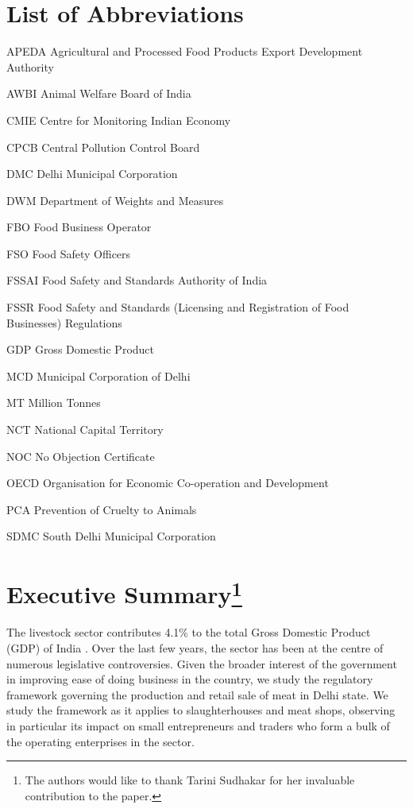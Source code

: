 \documentclass[a4paper, 12pt]{article}
\begin{document}
\section*{List of Abbreviations}
\begin{abbrv}
\item[APEDA] Agricultural and Processed Food Products Export Development Authority
\item[AWBI] Animal Welfare Board of India
\item[CMIE] Centre for Monitoring Indian Economy
\item[CPCB] Central Pollution Control Board
\item[DMC] Delhi Municipal Corporation
\item[DWM] Department of Weights and Measures
\item[FBO] Food Business Operator
\item[FSO] Food Safety Officers
\item[FSSAI] Food Safety and Standards Authority of India
\item[FSSR] Food Safety and Standards (Licensing and Registration of Food Businesses) Regulations
\item[GDP] Gross Domestic Product
\item[MCD] Municipal Corporation of Delhi
\item[MT] Million Tonnes
\item[NCT] National Capital Territory
\item[NOC] No Objection Certificate
\item[OECD] Organisation for Economic Co-operation and Development
\item[PCA] Prevention of Cruelty to Animals
\item[SDMC] South Delhi Municipal Corporation 
\end{abbrv}
\newpage
\section*{Executive Summary\footnote{The authors would like to thank Tarini Sudhakar for her invaluable contribution to the paper.}}

The livestock sector contributes 4.1\% to the total Gross Domestic Product (GDP) of India \parencite{economicreport}. Over the last few years, the sector has been at the centre of numerous legislative controversies. Given the broader interest of the government in improving ease of doing business in the country, we study the regulatory framework governing the production and retail sale of meat in Delhi state. We study the framework as it applies to slaughterhouses and meat shops, observing in particular its impact on small entrepreneurs and traders who form a bulk of the operating enterprises in the sector.\\
\end{document}
